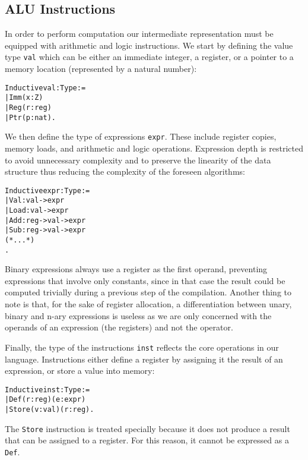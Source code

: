 \subsection{ALU Instructions}

In order to perform computation our intermediate representation must be equipped with arithmetic and logic instructions.
We start by defining the value type \texttt{val} which can be either an immediate integer, a register, or a pointer to a memory location (represented by a natural number):

\begin{alltt}
Inductive val : Type :=
  | Imm (x : Z)
  | Reg (r : reg)
  | Ptr (p : nat).
\end{alltt}

We then define the type of expressions \texttt{expr}. These include register copies, memory loads, and arithmetic and logic operations. Expression depth is restricted to avoid unnecessary complexity and to preserve the linearity of the data structure thus reducing the complexity of the foreseen algorithms:

\begin{alltt}
Inductive expr : Type :=
  | Val : val -> expr
  | Load : val -> expr
  | Add : reg -> val -> expr
  | Sub : reg -> val -> expr
  (* ... *)
.
\end{alltt}

Binary expressions always use a register as the first operand, preventing expressions that involve only constants, since in that case the result could be computed trivially during a previous step of the compilation. Another thing to note is that, for the sake of register allocation, a differentiation between unary, binary and n-ary expressions is useless as we are only concerned with the operands of an expression (the registers) and not the operator.

Finally, the type of the instructions \texttt{inst} reflects the core operations in our language. Instructions either define a register by assigning it the result of an expression, or store a value into memory:

\begin{alltt}
Inductive inst : Type :=
  | Def (r : reg) (e : expr)
  | Store (v : val) (r : reg).
\end{alltt}

The \texttt{Store} instruction is treated specially because it does not produce a result that can be assigned to a register. For this reason, it cannot be expressed as a \texttt{Def}.

